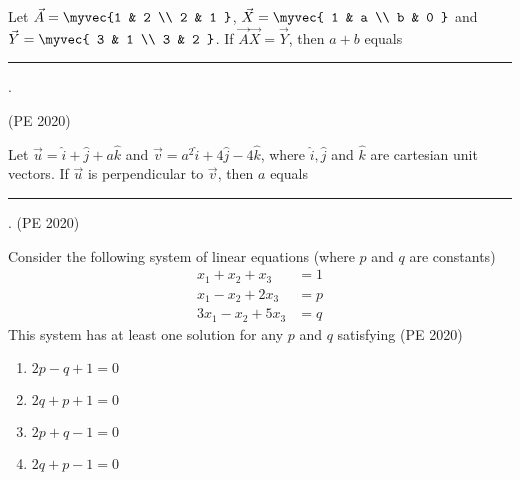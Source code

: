 \item Let $\vec{A} = \myvec{1 & 2 \\ 2 & 1 }$, $\vec{X} = \myvec{ 1 & a \\ b & 0 }$ and $\vec{Y} = \myvec{ 3 & 1 \\ 3 & 2 }$. If $\vec{A}\vec{X} = \vec{Y}$, then $a + b$ equals \rule{1cm}{0.01pt}.

  \hfill{(PE 2020)}
\item Let $\vec{u} = \hat{i} + \hat{j} + a\hat{k}$ and $\vec{v} = a^2\hat{i} + 4\hat{j} - 4\hat{k}$, where $\hat{i}, \hat{j}$ and $\hat{k}$ are cartesian unit vectors. If $\vec{u}$ is perpendicular to $\vec{v}$, then $a$ equals \rule{1cm}{0.01pt}.
  \hfill{(PE 2020)}
\item Consider the following system of linear equations (where $p$ and $q$ are constants)
\begin{align*}
x_1 + x_2 + x_3 &= 1 \\
x_1 - x_2 + 2x_3 &= p \\
3x_1 - x_2 + 5x_3 &= q
\end{align*}
This system has at least one solution for any $p$ and $q$ satisfying
  \hfill{(PE 2020)}
\begin{multicols}{4}
\begin{enumerate}
\item  $2p - q + 1 = 0$
\item  $2q + p + 1 = 0$
\item  $2p + q - 1 = 0$
\item  $2q + p - 1 = 0$
\end{enumerate}
\end{multicols}
